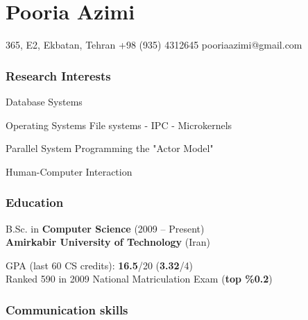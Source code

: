 \documentclass{tccv}
\begin{document}
\part{Pooria Azimi}










\personal
    {365, E2, Ekbatan, Tehran}
    {+98 (935) 4312645}
    {pooriaazimi@gmail.com}







\section{Research Interests}


\begin{research_interest}

\item{Database Systems}
     {}

\item{Operating Systems}
     {File systems - IPC - Microkernels}

\item{Parallel System Programming}
     {the "Actor Model"}

\item{Human-Computer Interaction}
     {}

\end{research_interest}








\section{Education}

B.Sc. in {\bf\large Computer Science} (2009 -- Present)
\\[1.5pt]
{\bf Amirkabir University of Technology} (Iran)

\bigskip
GPA (last 60 CS credits): {\bf 16.5}/20 ({\bf 3.32}/4)
\\
Ranked 590 in 2009 National Matriculation Exam ({\bf top \%0.2})








\section{Communication skills}
\end{document}
